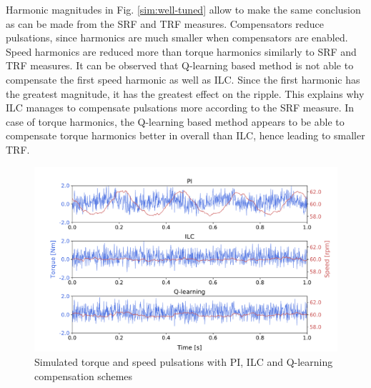 Harmonic magnitudes in Fig. \ref{sim:well-tuned} allow to make the same conclusion as can be made from the SRF and TRF measures. Compensators reduce pulsations, since harmonics are much smaller when compensators are enabled. Speed harmonics are reduced more than torque harmonics similarly to SRF and TRF measures. It can be observed that Q-learning based method is not able to compensate the first speed harmonic as well as ILC. Since the first harmonic has the greatest magnitude, it has the greatest effect on the ripple. This explains why ILC manages to compensate pulsations more according to the SRF measure. In case of torque harmonics, the Q-learning based method appears to be able to compensate torque harmonics better in overall than ILC, hence leading to smaller TRF.
\begin{figure}[htb] 
    \centering
    \includegraphics[width=1.0\textwidth]{images/simulation-results-time.pdf}
    \caption{Simulated torque and speed pulsations with PI, ILC and Q-learning compensation schemes}
    \label{sim:results-time}
\end{figure}

